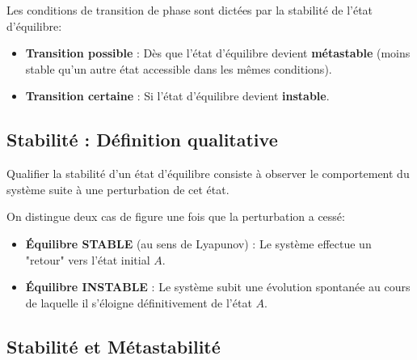 \documentclass[french]{yLectureNote}
\begin{document}
\begin{proposition}
Les conditions de transition de phase sont dictées par la stabilité de l'état d'équilibre:
\begin{itemize}
    \item \textbf{Transition possible} : Dès que l'état d'équilibre devient \textbf{métastable} (moins stable qu'un autre état accessible dans les mêmes conditions).
    \item \textbf{Transition certaine} : Si l'état d'équilibre devient \textbf{instable}.
\end{itemize}
\end{proposition}




\subsection{Stabilité : Définition qualitative}


Qualifier la stabilité d'un état d'équilibre consiste à observer le comportement du système suite à une perturbation de cet état.




\begin{theorem}
On distingue deux cas de figure une fois que la perturbation a cessé:
\begin{itemize}
    \item \textbf{Équilibre STABLE} (au sens de Lyapunov) : Le système effectue un "retour" vers l'état initial $A$.
    \item \textbf{Équilibre INSTABLE} : Le système subit une évolution spontanée au cours de laquelle il s'éloigne définitivement de l'état $A$.
\end{itemize}
\end{theorem}



\subsection{Stabilité et Métastabilité}
\end{document}
